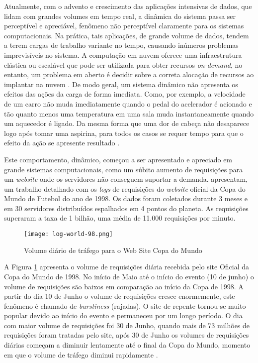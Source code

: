 Atualmente, com o advento e crescimento das aplicações intensivas de dados, que lidam com grandes volumes em tempo real, a dinâmica do sistema passa ser perceptível e apreciável, fenômeno não perceptível claramente para os sistemas computacionais. Na prática, tais aplicações, de grande volume de dados, tendem a terem cargas de trabalho variante no tempo, causando inúmeros problemas imprevisíveis no sistema. A computação em nuvem oferece uma infraestrutura elástica ou escalável que pode ser utilizada para obter recursos \textit{on-demand}, no entanto, um problema em aberto é decidir sobre a correta alocação de recursos ao implantar na nuvem \cite{Cervino2012}. De modo geral, um sistema dinâmico não apresenta os efeitos das ações da carga de forma imediata. Como, por exemplo, a velocidade de um carro não muda imediatamente quando o pedal do acelerador é acionado e tão quanto menos uma temperatura em uma sala muda instantaneamente quando um aquecedor é ligado. Da mesma forma que uma dor de cabeça não desaparece logo após tomar uma aspirina, para todos os casos se requer tempo para que o efeito da ação se apresente resultado \cite{Karl2008}.

Este comportamento, dinâmico, começou a ser apresentado e apreciado em grande sistemas computacionais, como um súbito aumento de requisições para um \textit{website} onde os servidores não conseguem suportar a demanda.  apresentam, um trabalho detalhado com os \textit{logs} de requisições do \textit{website} oficial da Copa do Mundo de Futebol do ano de 1998. Os dados foram coletados durante 3 meses e em 30 servidores distribuídos espalhados em 4 pontos do planeta. As requisições superaram a taxa de 1 bilhão, uma média de 11.000 requisições por minuto.

\begin{figure}[htb]
	\centering
	\texttt{[image: log-world-98.png]}
	\caption{Volume diário de tráfego para o Web Site Copa do Mundo}
	\label{fig:log98}		
\end{figure}

A Figura \ref{fig:log98} apresenta o volume de requisições diária recebida pelo site Oficial da Copa do Mundo de 1998. No início de Maio até o início do evento (10 de junho) o volume de requisições são baixos em comparação ao início da Copa de 1998. A partir do dia 10 de Junho o volume de requisições cresce enormemente, este fenômeno é chamado de \textit{burstiness} (rajadas). O site de repente tornou-se muito popular devido ao início do evento e permaneceu por um longo período. O dia com maior volume de requisições foi 30 de Junho, quando mais de 73 milhões de requisições foram tratadas pelo site, após 30 de Junho os volumes de requisições diárias começam a diminuir lentamente até o final da Copa do Mundo, momento em que o volume de tráfego diminui rapidamente \cite{Arlitt2000}.

